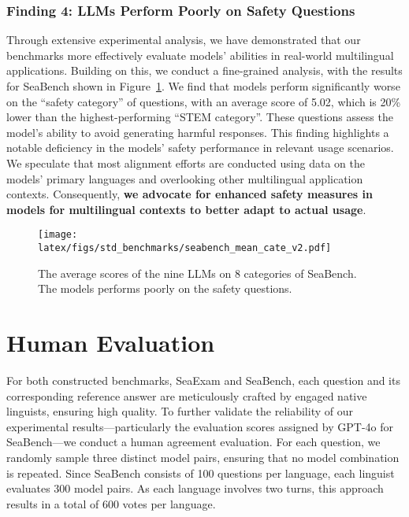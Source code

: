 \subsubsection{Finding 4: LLMs Perform Poorly on Safety Questions} \label{finding4}
Through extensive experimental analysis, we have demonstrated that our benchmarks more effectively evaluate models' abilities in real-world multilingual applications. Building on this, we conduct a fine-grained analysis, with the results for SeaBench shown in Figure~\ref{fig:seabench_mean_cate}. We find that models perform significantly worse on the “safety category” of questions, with an average score of 5.02, which is 20\% lower than the highest-performing “STEM category”. These questions assess the model’s ability to avoid generating harmful responses. This finding highlights a notable deficiency in the models' safety performance in relevant usage scenarios. We speculate that most alignment efforts are conducted using data on the models' primary languages and overlooking other multilingual application contexts. Consequently, \textbf{we advocate for enhanced safety measures in models for multilingual contexts to better adapt to actual usage}.


\begin{figure}[htb]
    \centering
    \texttt{[image: latex/figs/std\_benchmarks/seabench\_mean\_cate\_v2.pdf]}
    \caption{The average scores of the nine LLMs on 8 categories of SeaBench. The models performs poorly on the safety questions.}
    \label{fig:seabench_mean_cate}
\end{figure}


\section{Human Evaluation}



For both constructed benchmarks, SeaExam and SeaBench, each question and its corresponding reference answer are meticulously crafted by engaged native linguists, ensuring high quality. To further validate the reliability of our experimental results—particularly the evaluation scores assigned by GPT-4o for SeaBench—we conduct a human agreement evaluation. For each question, we randomly sample three distinct model pairs, ensuring that no model combination is repeated. Since SeaBench consists of 100 questions per language, each linguist evaluates 300 model pairs. As each language involves two turns, this approach results in a total of 600 votes per language. 


